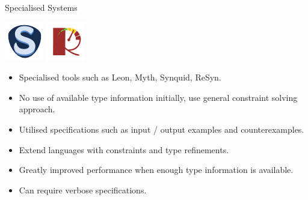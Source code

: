 \documentclass[presentation]{beamer}
\begin{document}
\begin{frame}[fragile]{Specialised Systems}
\begin{center}
  \includegraphics[scale=0.2]{Resource/synquid-logo.png}
  \includegraphics[scale=0.2]{Resource/resyn-logo.png}
\end{center}
  \begin{itemize}
  \item Specialised tools such as Leon, Myth, Synquid, ReSyn.
  \item No use of available type information initially, use general constraint solving approach.
  \item Utilised specifications such as input / output examples and counterexamples.
  \item Extend languages with constraints and type refinements.
  \item Greatly improved performance when enough type information is available.
  \item Can require verbose specifications.
  \end{itemize}
\end{frame}
\end{document}
